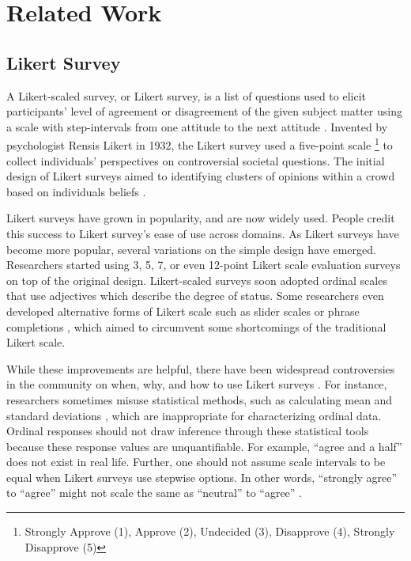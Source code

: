\section{Related Work} \label{related_works}

\subsection{Likert Survey}
A Likert-scaled survey, or Likert survey, is a list of questions used to elicit
participants' level of agreement or disagreement of the given subject matter using a scale with step-intervals from one attitude to the next attitude \cite{likert1932technique}. Invented by psychologist Rensis Likert in 1932, the Likert survey used a five-point scale \footnote{Strongly Approve (1), Approve (2), Undecided (3), Disapprove (4), Strongly Disapprove (5)} to collect individuals' perspectives on controversial societal questions. The initial design of Likert surveys aimed to identifying clusters of opinions within a crowd based on individuals beliefs \cite{joshi2015likert}. 

Likert surveys have grown in popularity, and are now widely used. People credit this success to Likert survey's ease of use across domains. As Likert surveys have become more popular, several variations on the simple design have emerged. Researchers started using 3, 5, 7, or even 12-point Likert scale evaluation surveys \cite{garland2008computer,finstad2010} on top of the original design. Likert-scaled surveys soon adopted ordinal scales that use adjectives which describe the degree of status. Some researchers even developed alternative forms of Likert scale such as slider scales \cite{roster2015exploring} or phrase completions \cite{hodge2003phrase}, which aimed to circumvent some shortcomings of the traditional Likert scale.

While these improvements are helpful, there have been widespread controversies in the community on when, why, and how to use Likert surveys \cite{bishop2015use}. For instance, researchers sometimes misuse statistical methods, such as calculating mean and standard deviations \cite{jamieson2004likert}, which are inappropriate for characterizing ordinal data. Ordinal responses should not draw inference through these statistical tools because these response values are unquantifiable. For example, ``agree and a half'' does not exist in real life. Further, one should not assume scale intervals to be equal when Likert surveys use stepwise options. In other words, ``strongly agree'' to ``agree'' might not scale the same as ``neutral'' to ``agree'' \cite{jamieson2004likert, edmondson2005likert}.


